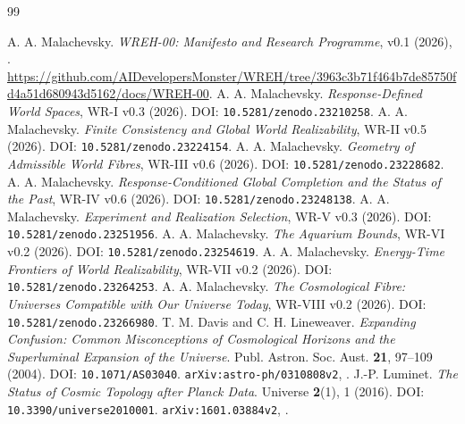\begin{thebibliography}{99}
\raggedright
{} A. A. Malachevsky. \emph{WREH-00: Manifesto and Research Programme}, v0.1 (2026), . \url{https://github.com/AIDevelopersMonster/WREH/tree/3963c3b71f464b7de85750fd4a51d680943d5162/docs/WREH-00}.
 A. A. Malachevsky. \emph{Response-Defined World Spaces}, WR-I v0.3 (2026). DOI: \texttt{10.5281/zenodo.23210258}.
 A. A. Malachevsky. \emph{Finite Consistency and Global World Realizability}, WR-II v0.5 (2026). DOI: \texttt{10.5281/zenodo.23224154}.
 A. A. Malachevsky. \emph{Geometry of Admissible World Fibres}, WR-III v0.6 (2026). DOI: \texttt{10.5281/zenodo.23228682}.
 A. A. Malachevsky. \emph{Response-Conditioned Global Completion and the Status of the Past}, WR-IV v0.6 (2026). DOI: \texttt{10.5281/zenodo.23248138}.
 A. A. Malachevsky. \emph{Experiment and Realization Selection}, WR-V v0.3 (2026). DOI: \nolinkurl{10.5281/zenodo.23251956}.
 A. A. Malachevsky. \emph{The Aquarium Bounds}, WR-VI v0.2 (2026). DOI: \texttt{10.5281/zenodo.23254619}.
 A. A. Malachevsky. \emph{Energy-Time Frontiers of World Realizability}, WR-VII v0.2 (2026). DOI: \nolinkurl{10.5281/zenodo.23264253}.
 A. A. Malachevsky. \emph{The Cosmological Fibre: Universes Compatible with Our Universe Today}, WR-VIII v0.2 (2026). DOI: \nolinkurl{10.5281/zenodo.23266980}.
 T. M. Davis and C. H. Lineweaver. \emph{Expanding Confusion: Common Misconceptions of Cosmological Horizons and the Superluminal Expansion of the Universe}. Publ. Astron. Soc. Aust. \textbf{21}, 97--109 (2004). DOI: \texttt{10.1071/AS03040}. \texttt{arXiv:astro-ph/0310808v2}, .
 J.-P. Luminet. \emph{The Status of Cosmic Topology after Planck Data}. Universe \textbf{2}(1), 1 (2016). DOI: \texttt{10.3390/universe2010001}. \texttt{arXiv:1601.03884v2}, .
\end{thebibliography}
